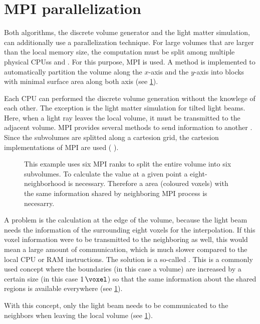 \section{MPI parallelization}\label{sec:mpiSim}
%
Both algorithms, the discrete volume generator and the light matter simulation, can additionally use a parallelization technique.
For large volumes that are larger than the local memory size, the computation must be split among multiple physical \acp{CPU}s and .
For this purpose,  \ac{MPI} is used.
A method is implemented to automatically partition the volume along the $x$-axis and the $y$-axis into blocks with minimal surface area along both axis (see \cref{fig:com_halo}).
\par
% 
Each \ac{CPU} can performed the discrete volume generation without the knowlege of each other.
The exception is the light matter simulation for tilted light beams.
Here, when a light ray leaves the local volume, it must be transmitted to the adjacent volume.
\ac{MPI} provides several methods to send information to another .
Since the subvolumes are splitted along a cartesion grid, the cartesion implementations of \ac{MPI} are used (\eg{} ).
%
\begin{figure}[!t]
    \centering
    \setlength{\tikzwidth}{0.85\textwidth}
    \caption{ This example uses six \ac{MPI} ranks to split the entire volume into six subvolumes. To calculate the value at a given point a eight-neighborhood is necessary. Therefore a  area (coloured voxels) with the same information shared by neighboring \ac{MPI} process is necesarry.}
    \label{fig:com_halo}
\end{figure}
%
A problem is the calculation at the edge of the volume, because the light beam needs the information of the surrounding eight voxels for the interpolation.
If this voxel information were to be transmitted to the neighboring  as well, this would mean a large amount of communication, which is much slower compared to the local \ac{CPU} or \ac{RAM} instructions.
The solution is a so-called .
This is a commonly used concept where the boundaries (in this case a volume) are increased by a certain size (in this case $\SI{1}{\voxel}$) so that the same information about the shared regions is available everywhere (see \cref{fig:com_halo}).
\par
%
With this concept, only the light beam needs to be communicated to the neighbors when leaving the local volume (see \cref{fig:com_halo}).

